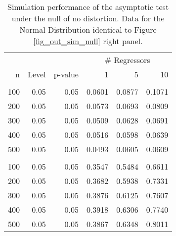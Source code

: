 \begin{table}
\small
\caption{Simulation performance of the asymptotic test under the null of no distortion. Data for the Normal Distribution identical to Figure \ref{fig_out_sim_null} right panel.}
\label{fig_out_sim_null_tabright}
 \parbox{0.99\textwidth}{
\centering
\begin{tabular}{rrrrrr}
\toprule
\multicolumn{3}{c}{ } & \multicolumn{3}{c}{\# Regressors} \\
\cmidrule(l{3pt}r{3pt}){4-6}
n & Level & p-value & 1 & 5 & 10\\
\midrule
\addlinespace[0.3em]
\multicolumn{6}{l}{\textbf{Normal Distribution}}\\
\hspace{1em}100 & 0.05 & 0.05 & 0.0601 & 0.0877 & 0.1071\\
\hspace{1em}200 & 0.05 & 0.05 & 0.0573 & 0.0693 & 0.0809\\
\hspace{1em}300 & 0.05 & 0.05 & 0.0509 & 0.0628 & 0.0691\\
\hspace{1em}400 & 0.05 & 0.05 & 0.0516 & 0.0598 & 0.0639\\
\hspace{1em}500 & 0.05 & 0.05 & 0.0493 & 0.0605 & 0.0609\\
\addlinespace[0.3em]
\multicolumn{6}{l}{\textbf{$t_3$ Distribution}}\\
\hspace{1em}100 & 0.05 & 0.05 & 0.3547 & 0.5484 & 0.6611\\
\hspace{1em}200 & 0.05 & 0.05 & 0.3682 & 0.5938 & 0.7331\\
\hspace{1em}300 & 0.05 & 0.05 & 0.3876 & 0.6125 & 0.7607\\
\hspace{1em}400 & 0.05 & 0.05 & 0.3918 & 0.6306 & 0.7740\\
\hspace{1em}500 & 0.05 & 0.05 & 0.3867 & 0.6348 & 0.8011\\
\bottomrule
\end{tabular}
}
 \end{table}